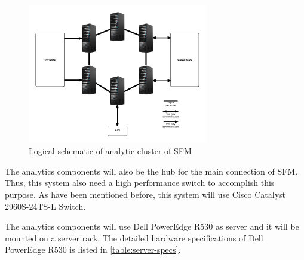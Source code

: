 \begin{figure}[H]
\centering
\includegraphics[width=0.7\textwidth]{6-hardware/images/analytic-cluster.png}
\caption{Logical schematic of analytic cluster of SFM}
\label{fig:analytic-cluster}
\end{figure}

The analytics components will also be the hub for the main connection of SFM. Thus, this system also need a high performance switch to accomplish this purpose. As have been mentioned before, this system will use Cisco Catalyst 2960S-24TS-L Switch.

The analytics components will use Dell PowerEdge R530 as server and it will be mounted on a server rack. The detailed hardware specifications of Dell PowerEdge R530 is listed in \autoref{table:server-specs}.
